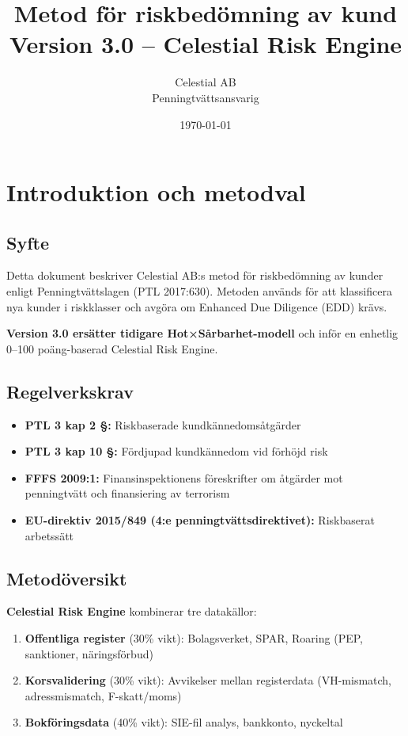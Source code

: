 \documentclass[12pt,a4paper]{article}
\title{\textbf{Metod för riskbedömning av kund} \\ \large Version 3.0 – Celestial Risk Engine}
\author{Celestial AB \\ Penningtvättsansvarig}
\date{\today}
\begin{document}
\maketitle
\tableofcontents
\newpage

\section{Introduktion och metodval}

\subsection{Syfte}

Detta dokument beskriver Celestial AB:s metod för riskbedömning av kunder enligt Penningtvättslagen (PTL 2017:630). Metoden används för att klassificera nya kunder i riskklasser och avgöra om Enhanced Due Diligence (EDD) krävs.

\textbf{Version 3.0 ersätter tidigare Hot×Sårbarhet-modell} och inför en enhetlig 0–100 poäng-baserad Celestial Risk Engine.

\subsection{Regelverkskrav}

\begin{itemize}[noitemsep]
  \item \textbf{PTL 3 kap 2 §:} Riskbaserade kundkännedomsåtgärder
  \item \textbf{PTL 3 kap 10 §:} Fördjupad kundkännedom vid förhöjd risk
  \item \textbf{FFFS 2009:1:} Finansinspektionens föreskrifter om åtgärder mot penningtvätt och finansiering av terrorism
  \item \textbf{EU-direktiv 2015/849 (4:e penningtvättsdirektivet):} Riskbaserat arbetssätt
\end{itemize}

\subsection{Metodöversikt}

\textbf{Celestial Risk Engine} kombinerar tre datakällor:

\begin{enumerate}[noitemsep]
  \item \textbf{Offentliga register} (30\% vikt): Bolagsverket, SPAR, Roaring (PEP, sanktioner, näringsförbud)
  \item \textbf{Korsvalidering} (30\% vikt): Avvikelser mellan registerdata (VH-mismatch, adressmismatch, F-skatt/moms)
  \item \textbf{Bokföringsdata} (40\% vikt): SIE-fil analys, bankkonto, nyckeltal
\end{enumerate}
\end{document}
